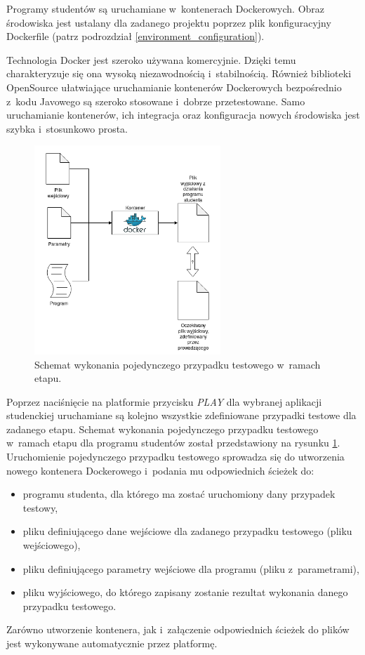 Programy studentów są uruchamiane w~kontenerach Dockerowych.
Obraz środowiska jest ustalany dla zadanego projektu poprzez plik konfiguracyjny Dockerfile (patrz podrozdział \ref{environment_configuration}).

Technologia Docker jest szeroko używana komercyjnie.
Dzięki temu charakteryzuje się ona wysoką niezawodnością i~stabilnością.
Również biblioteki OpenSource ułatwiające uruchamianie kontenerów Dockerowych bezpośrednio z~kodu Javowego są szeroko stosowane i~dobrze przetestowane.
Samo uruchamianie kontenerów, ich integracja oraz konfiguracja nowych środowiska jest szybka i~stosunkowo prosta.

\begin{figure}[h]
    \centering
    \includegraphics[width = 7cm]{chapter05/single_test_case.png}
    \caption{Schemat wykonania pojedynczego przypadku testowego w~ramach etapu.}
    \label{fig:single-test-case}
\end{figure}

Poprzez naciśnięcie na platformie przycisku \textit{PLAY} dla wybranej aplikacji studenckiej uruchamiane są kolejno wszystkie zdefiniowane przypadki testowe dla zadanego etapu.
Schemat wykonania pojedynczego przypadku testowego w~ramach etapu dla programu studentów został przedstawiony na rysunku \ref{fig:single-test-case}.
Uruchomienie pojedynczego przypadku testowego sprowadza się do utworzenia nowego kontenera Dockerowego i~podania mu odpowiednich ścieżek do:
\begin{itemize}
    \item programu studenta, dla którego ma zostać uruchomiony dany przypadek testowy,
    \item pliku definiującego dane wejściowe dla zadanego przypadku testowego (pliku wejściowego),
    \item pliku definiującego parametry wejściowe dla programu (pliku z~parametrami),
    \item pliku wyjściowego, do którego zapisany zostanie rezultat wykonania danego przypadku testowego.
\end{itemize}
Zarówno utworzenie kontenera, jak i~załączenie odpowiednich ścieżek do plików jest wykonywane automatycznie przez platformę.

